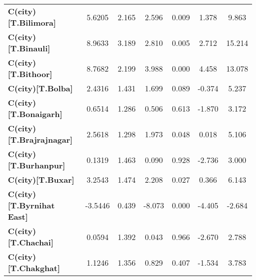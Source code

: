 \begin{center}
\begin{tabular}{lcccccc}
\textbf{C(city)[T.Bilimora]}                                                                        &       5.6205  &        2.165     &     2.596  &         0.009        &        1.378    &        9.863     \\
\textbf{C(city)[T.Binauli]}                                                                         &       8.9633  &        3.189     &     2.810  &         0.005        &        2.712    &       15.214     \\
\textbf{C(city)[T.Bithoor]}                                                                         &       8.7682  &        2.199     &     3.988  &         0.000        &        4.458    &       13.078     \\
\textbf{C(city)[T.Bolba]}                                                                           &       2.4316  &        1.431     &     1.699  &         0.089        &       -0.374    &        5.237     \\
\textbf{C(city)[T.Bonaigarh]}                                                                       &       0.6514  &        1.286     &     0.506  &         0.613        &       -1.870    &        3.172     \\
\textbf{C(city)[T.Brajrajnagar]}                                                                    &       2.5618  &        1.298     &     1.973  &         0.048        &        0.018    &        5.106     \\
\textbf{C(city)[T.Burhanpur]}                                                                       &       0.1319  &        1.463     &     0.090  &         0.928        &       -2.736    &        3.000     \\
\textbf{C(city)[T.Buxar]}                                                                           &       3.2543  &        1.474     &     2.208  &         0.027        &        0.366    &        6.143     \\
\textbf{C(city)[T.Byrnihat East]}                                                                   &      -3.5446  &        0.439     &    -8.073  &         0.000        &       -4.405    &       -2.684     \\
\textbf{C(city)[T.Chachai]}                                                                         &       0.0594  &        1.392     &     0.043  &         0.966        &       -2.670    &        2.788     \\
\textbf{C(city)[T.Chakghat]}                                                                        &       1.1246  &        1.356     &     0.829  &         0.407        &       -1.534    &        3.783     \\

\end{tabular}
\end{center}
